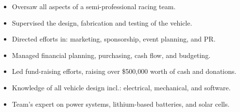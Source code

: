 \begin{entrylist}
{  \begin{itemize}[leftmargin=12pt]
    \item Oversaw all aspects of a semi-professional racing team.
    \item Supervised the design, fabrication and testing of the vehicle.
    \item Directed efforts in: marketing, sponsorship, event planning, and PR.
    \item Managed financial planning, purchasing, cash flow, and budgeting.
    \item Led fund-raising efforts, raising over \$500,000 worth of cash and donations.
    \item Knowledge of all vehicle design incl.: electrical, mechanical, and software.
    \item Team’s expert on power systems, lithium-based batteries, and solar cells.
  \end{itemize}
}
\end{entrylist}